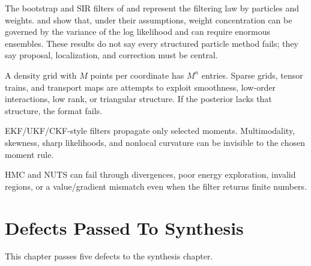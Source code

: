 \begin{description}[leftmargin=*, style=nextline]
  \item[Particle collapse.]
  The bootstrap and SIR filters of \citet{gordon1993novel} and
  \citet{arulampalam2002tutorial} represent the filtering law by particles and
  weights.  \citet{bengtsson2008curse} and \citet{snyder2008obstacles} show
  that, under their assumptions, weight concentration can be governed by the
  variance of the log likelihood and can require enormous ensembles.  These
  results do not say every structured particle method fails; they say proposal,
  localization, and correction must be central.

  \item[Grid explosion.]
  A density grid with $M$ points per coordinate has $M^n$ entries.  Sparse grids,
  tensor trains, and transport maps are attempts to exploit smoothness,
  low-order interactions, low rank, or triangular structure.  If the posterior
  lacks that structure, the format fails.

  \item[Gaussian projection bias.]
  EKF/UKF/CKF-style filters propagate only selected moments.  Multimodality,
  skewness, sharp likelihoods, and nonlocal curvature can be invisible to the
  chosen moment rule.

  \item[Sampler geometry.]
  HMC and NUTS can fail through divergences, poor energy exploration, invalid
  regions, or a value/gradient mismatch even when the filter returns finite
  numbers.
\end{description}

\section{Defects Passed To Synthesis}
\label{sec:bf-hd-foundations-defects}

This chapter passes five defects to the synthesis chapter.

